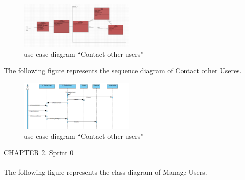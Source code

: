 \documentclass{article}
\begin{document}
{{{{{{{{\begin{figure}[htbp]
    \centering
    \includegraphics[width=0.5\textwidth]{DiagContact}
    \caption{use case diagram “Contact other users”}
    \label{fig:design2}
\end{figure}
The following figure represents the sequence diagram of Contact other Useres.\\
\begin{figure}[htbp]
    \centering
    \includegraphics[width=0.5\textwidth]{DiagContactSeq}
    \caption{use case diagram “Contact other users”}
    \label{fig:design2}
\end{figure}
\newpage
\noindent
CHAPTER 2.  Sprint 0 \\
\underline{\hspace{\textwidth}} \vspace{0.2cm}\\
The following figure represents the class diagram of Manage Users.\\

}}}}}}}}
\end{document}
